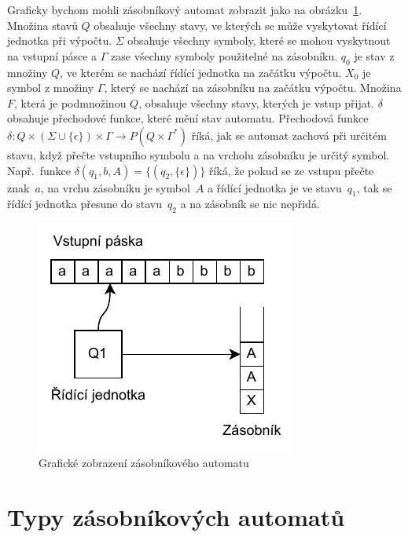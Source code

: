 Graficky bychom mohli zásobníkový automat zobrazit jako na obrázku~\ref{fig:PDAComponents}. Množina stavů $Q$ obsahuje všechny stavy, ve kterých se může vyskytovat řídící jednotka při výpočtu. $\Sigma$ obsahuje všechny symboly, které se mohou vyskytnout na vstupní pásce a $\Gamma$ zase všechny symboly použitelné na zásobníku. $q_0$ je stav z množiny $Q$, ve kterém se nachází řídící jednotka na začátku výpočtu. $X_0$ je symbol z množiny $\Gamma$, který se nachází na zásobníku na začátku výpočtu. Množina $F$, která je podmnožinou $Q$, obsahuje všechny stavy, kterých je vstup přijat. $\delta$ obsahuje přechodové funkce, které mění stav automatu. Přechodová funkce $\delta : Q \times (\Sigma \cup \{\epsilon\}) \times \Gamma \rightarrow P(Q \times \Gamma^*)$ říká, jak se automat zachová při určitém stavu, když přečte vstupního symbolu a na vrcholu zásobníku je určitý symbol. Např.\ funkce $\delta(q_1,b,A) = \{(q_2,\{\epsilon\})\}$ říká, že pokud se ze vstupu přečte znak~$a$, na vrchu zásobníku je symbol~$A$ a řídící jednotka je ve stavu~$q_1$, tak se řídící jednotka přesune do stavu~$q_2$ a na zásobník se nic nepřidá.

\begin{figure}[h]
    \centering
    \includegraphics{Figures/PDAComponents.drawio.pdf}
    \caption{Grafické zobrazení zásobníkového automatu}\label{fig:PDAComponents}
\end{figure}

\section{Typy zásobníkových automatů}\label{sec:TypesOfPDA}

